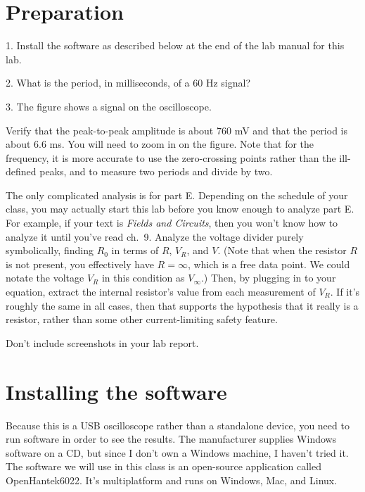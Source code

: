 \section*{Preparation}

1. Install the software as described below at the end of the lab manual for this lab.

2. What is the period, in milliseconds, of a 60 Hz signal?

3. The figure shows a signal on the oscilloscope.


Verify that the peak-to-peak amplitude is about 760 mV and that the period is about
6.6 ms. You will need to zoom in on the figure. Note that for the frequency, it is
more accurate to use the zero-crossing points rather than the ill-defined peaks,
and to measure two periods and divide by two.

\analysis

The only complicated analysis is for part E. Depending on the schedule of your class,
you may actually start this lab before you know enough to analyze part E. For example, if
your text is \emph{Fields and Circuits}, then you won't know how to analyze it until
you've read ch.~9.
Analyze the voltage divider purely symbolically, finding
$R_0$ in terms of $R$, $V_R$, and $V$. (Note that when the resistor $R$ is not present,
you effectively have $R=\infty$, which is a free data point. We could notate the
voltage $V_R$ in this condition as $V_\infty$.)
Then, by plugging in to your equation, extract the internal resistor's value from each
measurement of $V_R$. If it's roughly the same in all cases, then that supports the hypothesis that it
really is a resistor, rather than some other current-limiting safety feature.

Don't include screenshots in your lab report.

\section*{Installing the software}

Because this is a USB oscilloscope rather than a standalone device,
you need to run software in order to see the results. The manufacturer
supplies Windows software on a CD, but since I don't own a Windows machine,
I haven't tried it. The software we will use in this class is an open-source application
called OpenHantek6022.
It's multiplatform and runs on Windows, Mac, and Linux.

